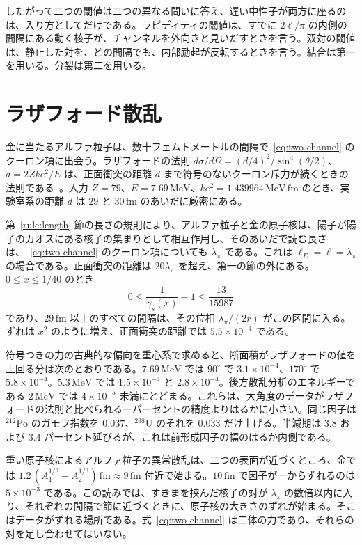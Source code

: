 \documentclass[a4paper]{article}
\begin{document}
したがって二つの閾値は二つの異なる問いに答え、遅い中性子が両方に座るのは、入り方としてだけである。ラピディティの閾値は、すでに \(2\ell/\pi\) の内側の間隔にある動く核子が、チャンネルを外向きと見いだすときを言う。双対の閾値は、静止した対を、どの間隔でも、内部励起が反転するときを言う。結合は第一を用いる。分裂は第二を用いる。

\section{ラザフォード散乱}
\label{sec:rutherford}

金に当たるアルファ粒子は、数十フェムトメートルの間隔で~\eqref{eq:two-channel} のクーロン項に出会う。ラザフォードの法則 \(d\sigma/d\Omega=(d/4)^{2}/\sin^{4}(\theta/2)\)、\(d=2Zke^{2}/E\) は、正面衝突の距離 \(d\) まで符号のないクーロン斥力が続くときの法則である~\cite{rutherford1911,geiger1913}。入力 \(Z=79\)、\(E=7.69\,\mathrm{MeV}\)、\(ke^{2}=1.439964\,\mathrm{MeV\,fm}\) のとき、実験室系の距離 \(d\) は \(29\) と \(30\,\mathrm{fm}\) のあいだに厳密にある。

第~\ref{rule:length} 節の長さの規則により、アルファ粒子と金の原子核は、陽子が陽子のカオスにある核子の集まりとして相互作用し、そのあいだで読む長さは、~\eqref{eq:two-channel} のクーロン項についても \(\lambda_\pi\) である。これは \(\ell_E=\ell=\lambda_\pi\) の場合である。正面衝突の距離は \(20\lambda_\pi\) を超え、第一の節の外にある。\(0\le x\le 1/40\) のとき
\[
0\le \frac{1}{\gamma_s(x)}-1\le\frac{13}{15987}
\]
であり、\(29\,\mathrm{fm}\) 以上のすべての間隔は、その位相 \(\lambda_\pi/(2r)\) がこの区間に入る。ずれは \(x^{2}\) のように増え、正面衝突の距離では \(5.5\times 10^{-4}\) である。

符号つきの力の古典的な偏向を重心系で求めると、断面積がラザフォードの値を上回る分は次のとおりである。\(7.69\,\mathrm{MeV}\) では \(90^\circ\) で \(3.1\times 10^{-4}\)、\(170^\circ\) で \(5.8\times 10^{-4}\)。\(5.3\,\mathrm{MeV}\) では \(1.5\times 10^{-4}\) と \(2.8\times 10^{-4}\)。後方散乱分析のエネルギーである \(2\,\mathrm{MeV}\) では \(4\times 10^{-5}\) 未満にとどまる。これらは、大角度のデータがラザフォードの法則と比べられる一パーセントの精度よりはるかに小さい。同じ因子は \({}^{212}\mathrm{Po}\) のガモフ指数を \(0.037\)、\({}^{238}\mathrm{U}\) のそれを \(0.033\) だけ上げる。半減期は \(3.8\) および \(3.4\) パーセント延びるが、これは前形成因子の幅のはるか内側である。

重い原子核によるアルファ粒子の異常散乱は、二つの表面が近づくところ、金では \(1.2\,(A_1^{1/3}+A_2^{1/3})\,\mathrm{fm}\approx 9\,\mathrm{fm}\) 付近で始まる。\(10\,\mathrm{fm}\) で因子が一からずれるのは \(5\times 10^{-3}\) である。この読みでは、すきまを挟んだ核子の対が \(\lambda_\pi\) の数倍以内に入り、それぞれの間隔で節に近づくときに、原子核の大きさのずれが始まる。そこはデータがずれる場所である。式~\eqref{eq:two-channel} は二体の力であり、それらの対を足し合わせてはいない。
\end{document}
